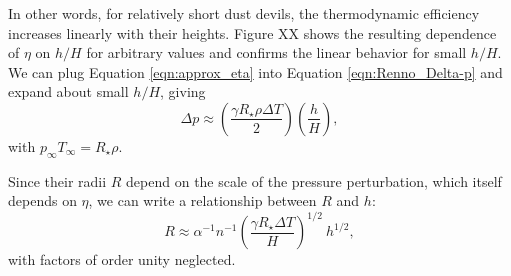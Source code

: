 \documentclass{aastex63}
\begin{document}
In other words, for relatively short dust devils, the thermodynamic efficiency increases linearly with their heights. Figure XX shows the resulting dependence of $\eta$ on $h/H$ for arbitrary values and confirms the linear behavior for small $h/H$. We can plug Equation \ref{eqn:approx_eta} into Equation \ref{eqn:Renno_Delta-p} and expand about small $h/H$, giving
\begin{equation}
    \Delta p \approx \left( \dfrac{\gamma R_\star \rho \Delta T}{2} \right) \left( \dfrac{h}{H} \right) \label{eqn:approx_Delta-p},
\end{equation}
with $p_\infty T_\infty = R_\star \rho$.

Since their radii $R$ depend on the scale of the pressure perturbation, which itself depends on $\eta$, we can write a relationship between $R$ and $h$:
\begin{equation}
    R \approx \alpha^{-1} n^{-1} \left( \dfrac{\gamma R_\star \Delta T}{H} \right)^{1/2}\ h^{1/2},\label{eqn:R_vs_h}
\end{equation}{}
with factors of order unity neglected.







\end{document}
